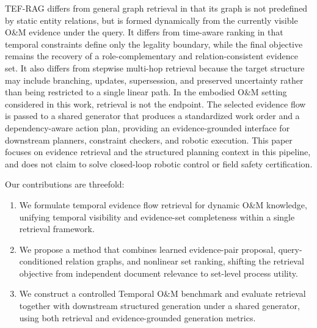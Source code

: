 TEF-RAG differs from general graph retrieval in that its graph is not predefined by static entity relations, but is formed dynamically from the currently visible O\&M evidence under the query. It differs from time-aware ranking in that temporal constraints define only the legality boundary, while the final objective remains the recovery of a role-complementary and relation-consistent evidence set. It also differs from stepwise multi-hop retrieval because the target structure may include branching, updates, supersession, and preserved uncertainty rather than being restricted to a single linear path.
In the embodied O\&M setting considered in this work, retrieval is not the endpoint. The selected evidence flow is passed to a shared generator that produces a standardized work order and a dependency-aware action plan, providing an evidence-grounded interface for downstream planners, constraint checkers, and robotic execution. This paper focuses on evidence retrieval and the structured planning context in this pipeline, and does not claim to solve closed-loop robotic control or field safety certification.

Our contributions are threefold:
\begin{enumerate}
    \item We formulate temporal evidence flow retrieval for dynamic O\&M knowledge, unifying temporal visibility and evidence-set completeness within a single retrieval framework.
    \item We propose a method that combines learned evidence-pair proposal, query-conditioned relation graphs, and nonlinear set ranking, shifting the retrieval objective from independent document relevance to set-level process utility.
    \item We construct a controlled Temporal O\&M benchmark and evaluate retrieval together with downstream structured generation under a shared generator, using both retrieval and evidence-grounded generation metrics.
\end{enumerate}

